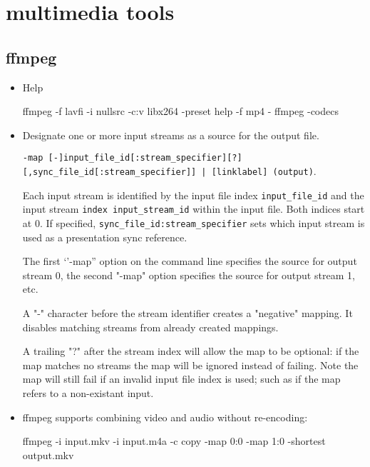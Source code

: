 \section{multimedia tools}

\subsection{ffmpeg}

\begin{itemize}

\item Help

\begin{bash}
ffmpeg -f lavfi -i nullsrc -c:v libx264 -preset help -f mp4 -
ffmpeg -codecs
\end{bash}

\item  Designate one or more input streams as a source for the output file.

\verb=-map [-]input_file_id[:stream_specifier][?][,sync_file_id[:stream_specifier]] | [linklabel] (output)=.

Each input stream is identified by the input file index \verb=input_file_id= and the input stream \verb=index input_stream_id=
 within the input file. Both indices start at 0. If specified, \verb=sync_file_id:stream_specifier=
           sets which input stream is used as a presentation sync reference.

           The first `'-map'' option on the command line specifies the source for output stream 0, the
           second "-map" option specifies the source for output stream 1, etc.

           A "-" character before the stream identifier creates a "negative" mapping.  It disables
           matching streams from already created mappings.

           A trailing "?" after the stream index will allow the map to be optional: if the map matches no
           streams the map will be ignored instead of failing. Note the map will still fail if an invalid
           input file index is used; such as if the map refers to a non-existant input.
          
          \item ffmpeg supports combining video and audio without re-encoding:
           
\begin{bash}
ffmpeg -i input.mkv -i input.m4a -c copy -map 0:0 -map 1:0 -shortest output.mkv


\end{bash}
\end{itemize}
